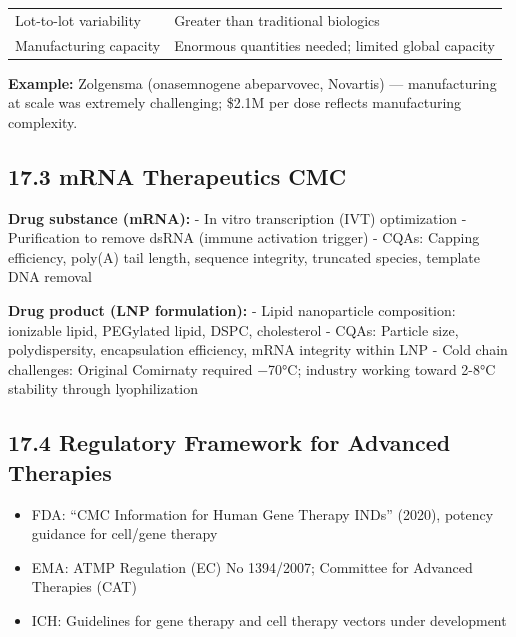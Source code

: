 \documentclass[
  11pt,
  a4paper,
]{report}
\providecommand{\tightlist}{%
  \setlength{\itemsep}{0pt}\setlength{\parskip}{0pt}}
\begin{document}
\begin{longtable}[]{@{}ll@{}}
\begin{minipage}[t]{0.54\columnwidth}\raggedright
Lot-to-lot variability\strut
\end{minipage} & \begin{minipage}[t]{0.40\columnwidth}\raggedright
Greater than traditional biologics\strut
\end{minipage}\tabularnewline
\begin{minipage}[t]{0.54\columnwidth}\raggedright
Manufacturing capacity\strut
\end{minipage} & \begin{minipage}[t]{0.40\columnwidth}\raggedright
Enormous quantities needed; limited global capacity\strut
\end{minipage}\tabularnewline
\bottomrule
\end{longtable}

\textbf{Example:} Zolgensma (onasemnogene abeparvovec, Novartis) ---
manufacturing at scale was extremely challenging; \$2.1M per dose
reflects manufacturing complexity.

\hypertarget{mrna-therapeutics-cmc}{%
\subsection{17.3 mRNA Therapeutics CMC}\label{mrna-therapeutics-cmc}}

\textbf{Drug substance (mRNA):} - In vitro transcription (IVT)
optimization - Purification to remove dsRNA (immune activation trigger)
- CQAs: Capping efficiency, poly(A) tail length, sequence integrity,
truncated species, template DNA removal

\textbf{Drug product (LNP formulation):} - Lipid nanoparticle
composition: ionizable lipid, PEGylated lipid, DSPC, cholesterol - CQAs:
Particle size, polydispersity, encapsulation efficiency, mRNA integrity
within LNP - Cold chain challenges: Original Comirnaty required −70°C;
industry working toward 2-8°C stability through lyophilization

\hypertarget{regulatory-framework-for-advanced-therapies}{%
\subsection{17.4 Regulatory Framework for Advanced
Therapies}\label{regulatory-framework-for-advanced-therapies}}

\begin{itemize}
\tightlist
\item
  FDA: ``CMC Information for Human Gene Therapy INDs'' (2020), potency
  guidance for cell/gene therapy
\item
  EMA: ATMP Regulation (EC) No 1394/2007; Committee for Advanced
  Therapies (CAT)
\item
  ICH: Guidelines for gene therapy and cell therapy vectors under
  development
\end{itemize}
\end{document}
